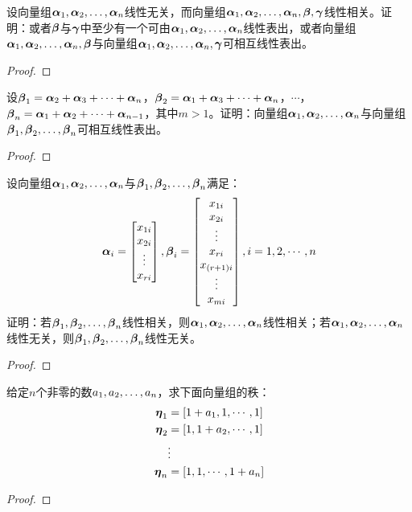 \begin{problem}\label{problem-2.32}
设向量组\(\enums{\vecal}{n}\)线性无关，而向量组\(\enums{\vecal}{n},\vecbeta,\vecgamma\)线性相关。证明：或者\(\vecbeta\)与\(\vecgamma\)中至少有一个可由\(\enums{\vecal}{n}\)线性表出，或者向量组\(\enums{\vecal}{n},\vecbeta\)与向量组\(\enums{\vecal}{n},\vecgamma\)可相互线性表出。
\end{problem}
\begin{proof}
\end{proof}

\begin{problem}\label{problem-2.33}
设\(\vecbeta_1=\vecal_2+\vecal_3+\cdots+\vecal_{n}\)，\(\vecbeta_2=\vecal_1+\vecal_3+\cdots+\vecal_{n}\)，\(\cdots\)，\(\vecbeta_n=\vecal_1+\vecal_2+\cdots+\vecal_{n-1}\)，其中\(m>1\)。证明：向量组\(\enums{\vecal}{n}\)与向量组\(\enums{\vecbeta}{n}\)可相互线性表出。
\end{problem}
\begin{proof}
\end{proof}

\begin{problem}\label{problem-2.34}
设向量组\(\enums{\vecal}{n}\)与\(\enums{\vecbeta}{n}\)满足：
\begin{equation*}
    \vecal_i=\begin{bmatrix}x_{1i}\\x_{2i}\\\vdots\\x_{ri}\end{bmatrix},
    \vecbeta_i=\begin{bmatrix}x_{1i}\\x_{2i}\\\vdots\\x_{ri}\\x_{\mypar{r+1}i}\\\vdots\\x_{mi}\end{bmatrix},
    i=1,2,\cdots,n
\end{equation*}
证明：若\(\enums{\vecbeta}{n}\)线性相关，则\(\enums{\vecal}{n}\)线性相关；若\(\enums{\vecal}{n}\)线性无关，则\(\enums{\vecbeta}{n}\)线性无关。
\end{problem}
\begin{proof}
\end{proof}

\begin{problem}\label{problem-2.35}
给定\(n\)个非零的数\(\enums{a}{n}\)，求下面向量组的秩：
\begin{align*}
    \veceta_1 & =\mat{1+a_1,1,\cdots,1} \\
    \veceta_2 & =\mat{1,1+a_2,\cdots,1} \\
              & \vdots                  \\
    \veceta_n & =\mat{1,1,\cdots,1+a_n}
\end{align*}
\end{problem}
\begin{proof}
\end{proof}

